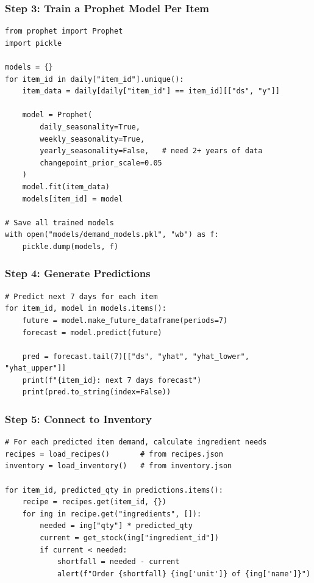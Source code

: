 \documentclass[12pt, a4paper]{article}
\begin{document}
\subsubsection{Step 3: Train a Prophet Model Per Item}
\begin{lstlisting}
from prophet import Prophet
import pickle

models = {}
for item_id in daily["item_id"].unique():
    item_data = daily[daily["item_id"] == item_id][["ds", "y"]]
    
    model = Prophet(
        daily_seasonality=True,
        weekly_seasonality=True,
        yearly_seasonality=False,   # need 2+ years of data
        changepoint_prior_scale=0.05
    )
    model.fit(item_data)
    models[item_id] = model

# Save all trained models
with open("models/demand_models.pkl", "wb") as f:
    pickle.dump(models, f)
\end{lstlisting}

\subsubsection{Step 4: Generate Predictions}
\begin{lstlisting}
# Predict next 7 days for each item
for item_id, model in models.items():
    future = model.make_future_dataframe(periods=7)
    forecast = model.predict(future)
    
    pred = forecast.tail(7)[["ds", "yhat", "yhat_lower", "yhat_upper"]]
    print(f"{item_id}: next 7 days forecast")
    print(pred.to_string(index=False))
\end{lstlisting}

\subsubsection{Step 5: Connect to Inventory}
\begin{lstlisting}
# For each predicted item demand, calculate ingredient needs
recipes = load_recipes()       # from recipes.json
inventory = load_inventory()   # from inventory.json

for item_id, predicted_qty in predictions.items():
    recipe = recipes.get(item_id, {})
    for ing in recipe.get("ingredients", []):
        needed = ing["qty"] * predicted_qty
        current = get_stock(ing["ingredient_id"])
        if current < needed:
            shortfall = needed - current
            alert(f"Order {shortfall} {ing['unit']} of {ing['name']}")
\end{lstlisting}
\end{document}
